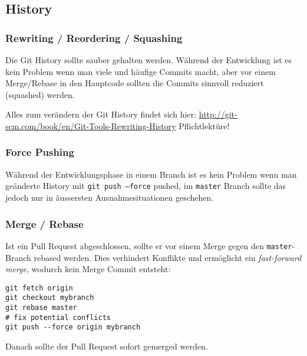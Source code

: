 \documentclass{article}
\begin{document}
\subsection{History}

\subsubsection{Rewriting / Reordering / Squashing}

Die Git History sollte sauber gehalten werden. Während der Entwicklung ist es
kein Problem wenn man viele und häufige Commits macht, aber vor einem
Merge/Rebase in den Hauptcode sollten die Commits sinnvoll reduziert (squashed)
werden. 

Alles zum verändern der Git History findet sich hier:
\url{http://git-scm.com/book/en/Git-Tools-Rewriting-History} Pflichtlektüre!

\subsubsection{Force Pushing}

Während der Entwicklungsphase in einem Branch ist es kein Problem wenn man
geänderte History mit \texttt{git push --force} pushed, im \texttt{master}
Branch sollte das jedoch nur in äussersten Ausnahmesituationen geschehen.

\subsubsection{Merge / Rebase}

Ist ein Pull Request abgeschlossen, sollte er vor einem Merge gegen den
\texttt{master}-Branch rebased werden. Dies verhindert Konflikte und ermöglicht
ein \textit{fast-forward merge}, wodurch kein Merge Commit entsteht:

\begin{verbatim}
git fetch origin
git checkout mybranch
git rebase master
# fix potential conflicts
git push --force origin mybranch
\end{verbatim}

Danach sollte der Pull Request sofort gemerged werden.
\end{document}
